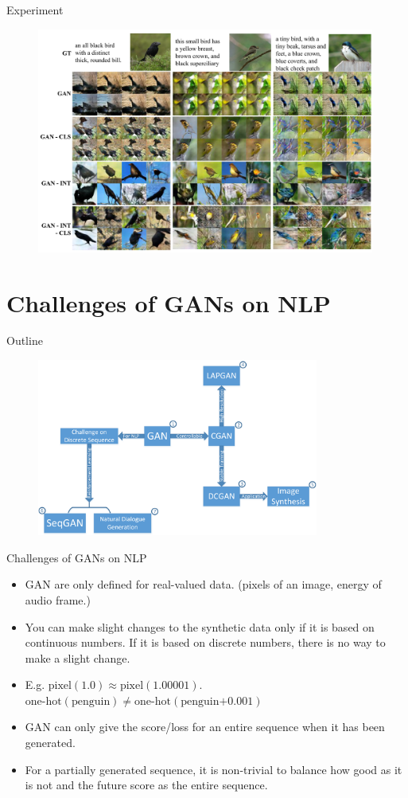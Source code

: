 \documentclass[10pt]{beamer}
\newcommand{\subtitlepage}[3]{\title{#1}\subtitle{#2}\author{#3}\date{}\begin{frame}[plain]\titlepage\end{frame}}
\begin{document}
	\begin{frame}{Experiment}
		\begin{figure}
			\includegraphics[width=30em]{figures/image-synthesis-experiment.PNG}
		\end{figure}
	\end{frame}
	
	\part{Challenges of GANs on NLP}
	\begin{frame}{Outline}
		\begin{figure}
			\includegraphics[width=25em]{figures/outline.png}
		\end{figure}
	\end{frame}
	\subtitlepage{}{Challenges of GANs on NLP}{}
	\begin{frame}{Challenges of GANs on NLP}
		\begin{itemize}
			\item GAN are only defined for real-valued data. (pixels of an image, energy of audio frame.)
			\item You can make slight changes to the synthetic data only if it is based on continuous numbers. If it is based on discrete numbers, there is no way to make a slight change.
			\item E.g. $\text{pixel}(1.0)\approx\text{pixel}(1.00001)$. $\text{one-hot}(\text{penguin})\neq\text{one-hot}(\text{penguin+0.001})$
			\item GAN can only give the score/loss for an entire sequence when it has been generated.
			\item For a partially generated sequence, it is non-trivial to balance how good as it is not and the future score as the entire sequence.
		\end{itemize}
	\end{frame}
\end{document}
